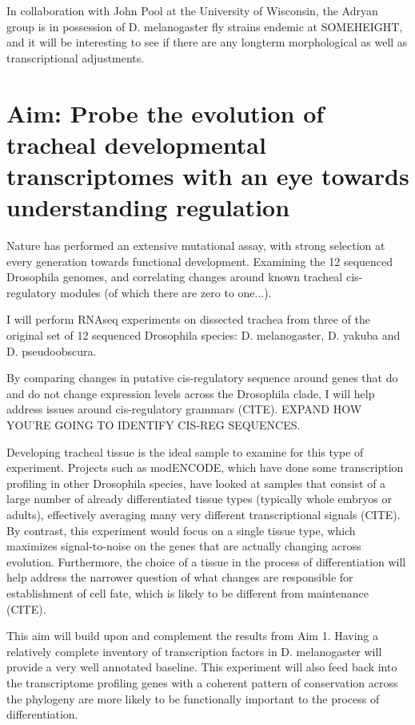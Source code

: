 \documentclass{proposal}
\begin{document}
In collaboration with John Pool at the University of Wisconsin, the Adryan group is in possession of D. melanogaster fly strains endemic at SOMEHEIGHT, and it will be interesting to see if there are any longterm morphological as well as transcriptional adjustments.

\section{Aim: Probe the evolution of tracheal developmental transcriptomes with an eye towards understanding regulation}
Nature has performed an extensive mutational assay, with strong selection at every generation towards functional development.  Examining the 12 sequenced Drosophila genomes, and correlating changes around known tracheal cis-regulatory modules (of which there are zero to one...).

I will perform RNAseq experiments on dissected trachea from three of the original set of 12 sequenced Drosophila species: D. melanogaster, D. yakuba and D. pseudoobscura.

By comparing changes in putative cis-regulatory sequence around genes that do and do not change expression levels across the Drosophila clade, I will help address issues around cis-regulatory grammars (CITE). EXPAND HOW YOU'RE GOING TO IDENTIFY CIS-REG SEQUENCES.

Developing tracheal tissue is the ideal sample to examine for this type of experiment.  Projects such as modENCODE, which have done some transcription profiling in other Drosophila species, have looked at samples that consist of a large number of already differentiated tissue types (typically whole embryos or adults), effectively averaging many very different transcriptional signals (CITE).  By contrast, this experiment would focus on a single tissue type, which maximizes signal-to-noise on the genes that are actually changing across evolution.  Furthermore, the choice of a tissue in the process of differentiation will help address the narrower question of what changes are responsible for establishment of cell fate, which is likely to be different from maintenance (CITE). 

This aim will build upon and complement the results from Aim 1.  Having a relatively complete inventory of transcription factors in D. melanogaster will provide a very well annotated baseline.   This experiment will also feed back into the transcriptome profiling genes with a coherent pattern of conservation across the phylogeny are more likely to be functionally important to the process of differentiation.
\end{document}
